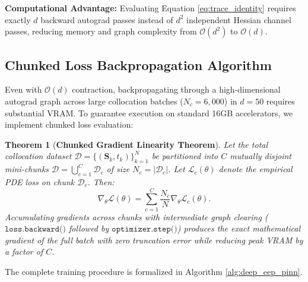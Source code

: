 \documentclass[11pt,a4paper]{article}
\newtheorem{theorem}{Theorem}
\begin{document}
\noindent\textbf{Computational Advantage:} Evaluating Equation \eqref{eq:trace_identity} requires exactly $d$ backward autograd passes instead of $d^2$ independent Hessian channel passes, reducing memory and graph complexity from $\mathcal{O}(d^2)$ to $\mathcal{O}(d)$.

\subsection{Chunked Loss Backpropagation Algorithm}
Even with $\mathcal{O}(d)$ contraction, backpropagating through a high-dimensional autograd graph across large collocation batches ($N_c = 6,000$) in $d=50$ requires substantial VRAM. To guarantee execution on standard 16GB accelerators, we implement chunked loss evaluation:

\begin{theorem}[\textbf{Chunked Gradient Linearity Theorem}]
\label{thm:chunked_linearity}
Let the total collocation dataset $\mathcal{D} = \{(\mathbf{S}_k, t_k)\}_{k=1}^N$ be partitioned into $C$ mutually disjoint mini-chunks $\mathcal{D} = \bigcup_{c=1}^C \mathcal{D}_c$ of size $N_c = |\mathcal{D}_c|$. Let $\mathcal{L}_c(\theta)$ denote the empirical PDE loss on chunk $\mathcal{D}_c$. Then:
\begin{equation}
\label{eq:chunked_grad_exact}
\nabla_\theta \mathcal{L}(\theta) = \sum_{c=1}^C \frac{N_c}{N} \nabla_\theta \mathcal{L}_c(\theta).
\end{equation}
Accumulating gradients across chunks with intermediate graph clearing ($\texttt{loss.backward()}$ followed by $\texttt{optimizer.step()}$) produces the exact mathematical gradient of the full batch with zero truncation error while reducing peak VRAM by a factor of $C$.
\end{theorem}

The complete training procedure is formalized in Algorithm \ref{alg:deep_eep_pinn}.
\end{document}
